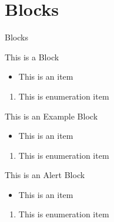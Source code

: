 \documentclass{beamer}
\begin{document}
\section{Blocks}
\begin{frame}[shrink]{Blocks}
	\begin{block}{This is a Block}
		\begin{itemize}
			\item This is an item
		\end{itemize}
		\begin{enumerate}
			\item This is enumeration item
		\end{enumerate}
	\end{block}
	\begin{exampleblock}{This is an Example Block}
		\begin{itemize}
			\item This is an item
		\end{itemize}
		\begin{enumerate}
			\item This is enumeration item
		\end{enumerate}
	\end{exampleblock}
	\begin{alertblock}{This is an Alert Block}
		\begin{itemize}
			\item This is an item
		\end{itemize}
		\begin{enumerate}
			\item This is enumeration item
		\end{enumerate}
	\end{alertblock}
\end{frame}
\end{document}
